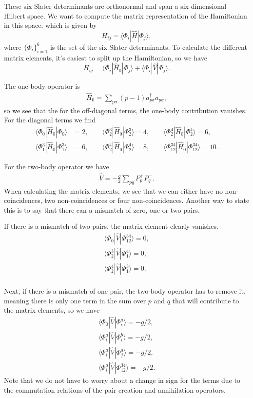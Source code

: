 \documentclass[a4paper, 11pt, notitlepage, english]{article}
\newcommand{\op}[1]{\hat{#1}}
\newcommand{\braopket}[3]{\langle #1 | {#2} | #3 \rangle}
\begin{document}
These six Slater determinants are orthonormal and span a six-dimensional Hilbert space. We want to compute the matrix representation of the Hamiltonian in this space, which is given by
$$H_{ij} = \braopket{\Phi_i}{\op{H}}{\Phi_j},$$
where $\{\Phi_i\}_{i=1}^6$ is the set of the six Slater determinants. To calculate the different matrix elements, it's easiest to split up the Hamiltonian, so we have
$$H_{ij} = \braopket{\Phi_i}{\op{H}_0}{\Phi_j} + \braopket{\Phi_i}{\op{V}}{\Phi_j}. $$

The one-body operator is
\begin{align*}
\op{H}_0 = \sum_{p\sigma} (p-1)a_{p\sigma}^\dagger a_{p\sigma},
\end{align*}
so we see that the for the off-diagonal terms, the one-body contribution vanishes. For the diagonal terms we find
\begin{align*}
\braopket{\Phi_0}{\op{H}_0}{\Phi_0} &= 2, \qquad \braopket{\Phi_2^3}{\op{H}_0}{\Phi_2^3} = 4, \qquad \braopket{\Phi_2^{4}}{\op{H}_0}{\Phi_2^{4}} = 6, \\
\braopket{\Phi_1^3}{\op{H}_0}{\Phi_1^{3}} &= 6, \qquad \braopket{\Phi_2^{4}}{\op{H}_0}{\Phi_2^{4}} = 8, \qquad \braopket{\Phi_{12}^{34}}{\op{H}_0}{\Phi_{12}^{34}} = 10.
\end{align*}

For the two-body operator we have
\begin{align*}
\op{V} = -\frac{g}{2}\sum_{pq} P_p^+ P_q^-.
\end{align*}
When calculating the matrix elements, we see that we can either have no non-coincidences, two non-coincidences or four non-coincidences. Another way to state this is to say that there can a mismatch of zero, one or two pairs. 

If there is a mismatch of two pairs, the matrix element clearly vanishes.
\begin{align*}
\braopket{\Phi_0}{\op{V}}{\Phi_{12}^{34}} = 0, \\
\braopket{\Phi_2^3}{\op{V}}{\Phi_{1}^{4}} = 0, \\
\braopket{\Phi_2^4}{\op{V}}{\Phi_{1}^{3}} = 0. \\
\end{align*}

Next, if there is a mismatch of one pair, the two-body operator has to remove it, meaning there is only one term in the sum over $p$ and $q$ that will contribute to the matrix elements, so we have
\begin{align*}
\braopket{\Phi_0}{\op{V}}{\Phi_i^a} = -g/2, \\
\braopket{\Phi_i^a}{\op{V}}{\Phi_i^{b}} = -g/2, \\
\braopket{\Phi_i^a}{\op{V}}{\Phi_j^{a}} = -g/2, \\
\braopket{\Phi_i^a}{\op{V}}{\Phi_{12}^{34}} = -g/2.
\end{align*}
Note that we do not have to worry about a change in sign for the terms due to the commutation relations of the pair creation and annihilation operators.
\end{document}
